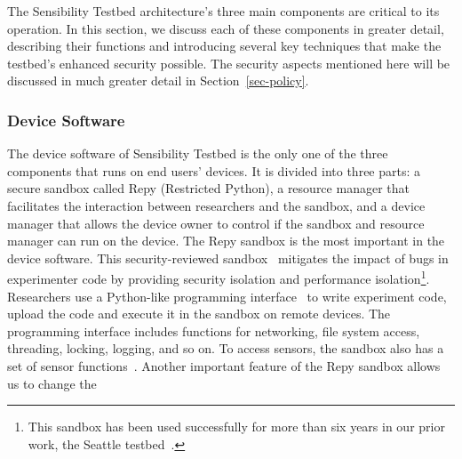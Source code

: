 The Sensibility Testbed architecture's three main components are critical 
to its operation. In this section, we discuss each of these components in 
greater detail, describing their functions and introducing several key 
techniques that make the testbed's enhanced security possible. The security 
aspects mentioned here will be discussed in much greater detail in 
Section~\ref{sec-policy}.

\subsubsection{Device Software}\label{sec-repy}

The device software of Sensibility Testbed is the only one of the three 
components that runs on end users' devices. It is divided into three 
parts: a secure sandbox called Repy (Restricted Python), a resource 
manager that facilitates the interaction between researchers and the 
sandbox, and a device manager that allows the device owner to control 
if the sandbox and resource manager can run on the device.
The Repy sandbox is the most important in the device software. This 
security-reviewed sandbox~\cite{cappos2010retaining} mitigates the 
impact of bugs in experimenter code by providing security isolation 
and performance isolation\footnote{\scriptsize 
This sandbox has been used successfully for more than six years in our 
prior work, the Seattle testbed~\cite{seattle}.}. 
Researchers use a Python-like programming interface~\cite{repyv2}
to write experiment code, upload the code and execute it in the
sandbox on remote devices. The programming interface includes functions for networking, 
file system access, threading, locking, logging, and so on. To access sensors, 
the sandbox also has a set of sensor functions~\cite{sensors}. 
%
Another important feature of the Repy sandbox allows us to change the 
